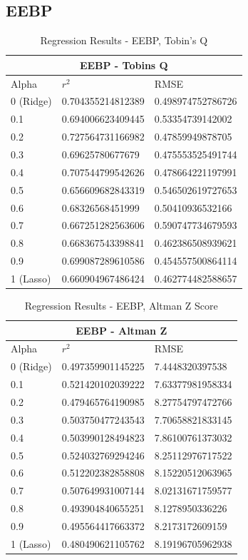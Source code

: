 \subsection{EEBP}
\begin{table}[h!]
\centering
\begin{tabular}{ |p{2.5cm}||p{4cm}|p{4cm}| }
 \hline
 \multicolumn{3}{|c|}{EEBP - Tobins Q} \\
 \hline
 Alpha & $r^2$ & RMSE \\
 \hline
0 (Ridge) & 0.704355214812389 & 0.498974752786726\\
0.1 & 0.694006623409445 & 0.53354739142002\\
\rowcolor{gray}0.2 & 0.727564731166982 & 0.47859949878705\\
0.3 & 0.69625780677679 & 0.475553525491744\\
0.4 & 0.707544799542626 & 0.478664221197991\\
0.5 & 0.656609682843319 & 0.546502619727653\\
0.6 & 0.68326568451999 & 0.50410936532166\\
0.7 & 0.667251282563606 & 0.590747734679593\\
0.8 & 0.668367543398841 & 0.462386508939621\\
0.9 & 0.699087289610586 & 0.454557500864114\\
1 (Lasso) & 0.660904967486424 & 0.462774482588657\\
 \hline
\end{tabular}
\caption{Regression Results  - EEBP, Tobin's Q}
\end{table}

\begin{table}[h!]
\centering
\begin{tabular}{ |p{2.5cm}||p{4cm}|p{4cm}| }
 \hline
 \multicolumn{3}{|c|}{EEBP - Altman Z} \\
 \hline
 Alpha & $r^2$ & RMSE \\
 \hline
0 (Ridge) & 0.497359901145225 & 7.4448320397538\\
\rowcolor{gray}0.1 & 0.521420102039222 & 7.63377981958334\\
0.2 & 0.479465764190985 & 8.27754797472766\\
0.3 & 0.503750477243543 & 7.70658821833145\\
0.4 & 0.503990128494823 & 7.86100761373032\\
0.5 & 0.524032769294246 & 8.25112976717522\\
0.6 & 0.512202382858808 & 8.15220512063965\\
0.7 & 0.507649931007144 & 8.02131671759577\\
0.8 & 0.493904840655251 & 8.1278950336226\\
0.9 & 0.495564417663372 & 8.2173172609159\\
1 (Lasso) & 0.480490621105762 & 8.19196705962938\\
 \hline
\end{tabular}
\caption{Regression Results  - EEBP, Altman Z Score}
\end{table}

